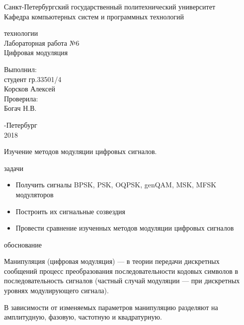 \documentclass[a4paper,12pt]{article}
\begin{document}
\begin{center}
Санкт-Петербургский государственный политехнический университет
\\Кафедра компьютерных систем и программных технологий
\end{center}
\vspace*{10em plus .6em minus .5em}

\begin{center}
{ технологии
\\Лабораторная работа №6
\\Цифровая модуляция}
\end{center}

\vspace*{5em plus .6em minus .5em}
\begin{flushright}
Выполнил:\\студент гр.33501/4\\Корсков Алексей\\Проверила:\\Богач Н.В.
\end{flushright}

\vspace*{15em plus .6em minus .5em}
\begin{center}
{-Петербург
\\2018}
\end{center}
\pagestyle{empty}
\newpage
\pagestyle{plain}
{}

Изучение методов модуляции цифровых сигналов.

{ задачи}

\begin{itemize}
\item Получить сигналы BPSK, PSK, OQPSK, genQAM, MSK, MFSK
модуляторов
\item Построить их сигнальные созвездия
\item Провести сравнение изученных методов модуляции цифровых
сигналов
\end{itemize}

{ обоснование}

Манипуляция (цифровая модуляция) — в теории передачи дискретных сообщений процесс преобразования последовательности кодовых символов в последовательность сигналов (частный случай модуляции — при дискретных уровнях модулирующего сигнала).

В зависимости от изменяемых параметров манипуляцию разделяют на амплитудную, фазовую, частотную и квадратурную.
\end{document}
